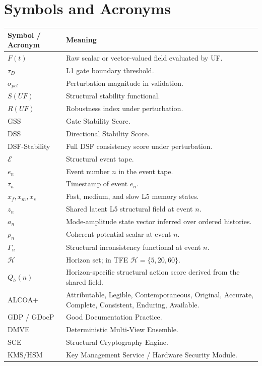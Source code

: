 \documentclass[11pt]{report}
\newcommand{\E}{\mathcal{E}}
\begin{document}
\section{Symbols and Acronyms}
\begin{longtable}{p{}p{}}
\toprule
Symbol / Acronym & Meaning \\
\midrule
$F(t)$ & Raw scalar or vector-valued field evaluated by UF. \\
$\tau_D$ & L1 gate boundary threshold. \\
$\sigma_{pct}$ & Perturbation magnitude in validation. \\
$S(UF)$ & Structural stability functional. \\
$R(UF)$ & Robustness index under perturbation. \\
GSS & Gate Stability Score. \\
DSS & Directional Stability Score. \\
DSF-Stability & Full DSF consistency score under perturbation. \\
$\E$ & Structural event tape. \\
$e_n$ & Event number $n$ in the event tape. \\
$\tau_n$ & Timestamp of event $e_n$. \\
$x_f,x_m,x_s$ & Fast, medium, and slow L5 memory states. \\
$z_n$ & Shared latent L5 structural field at event $n$. \\
$a_n$ & Mode-amplitude state vector inferred over ordered histories. \\
$\rho_n$ & Coherent-potential scalar at event $n$. \\
$\Gamma_n$ & Structural inconsistency functional at event $n$. \\
$\mathcal{H}$ & Horizon set; in TFE $\mathcal{H}=\{5,20,60\}$. \\
$Q_h(n)$ & Horizon-specific structural action score derived from the shared field. \\
ALCOA+ & Attributable, Legible, Contemporaneous, Original, Accurate, Complete, Consistent, Enduring, Available. \\
GDP / GDocP & Good Documentation Practice. \\
DMVE & Deterministic Multi-View Ensemble. \\
SCE & Structural Cryptography Engine. \\
KMS/HSM & Key Management Service / Hardware Security Module. \\
\bottomrule
\end{longtable}
\end{document}
